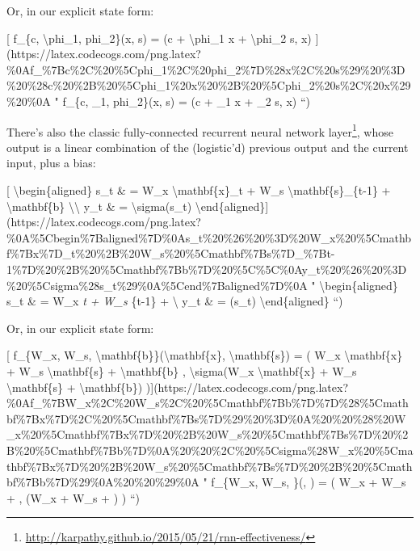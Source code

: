 \documentclass[]{article}
\renewcommand{\href}[2]{#2\footnote{\url{#1}}}
\begin{document}
Or, in our explicit state form:

{[} f\_\{c, \textbackslash{}phi\_1, phi\_2\}(x, s) = (c + \textbackslash{}phi\_1
x + \textbackslash{}phi\_2 s, x)
{]}(https://latex.codecogs.com/png.latex?\%0Af\_\%7Bc\%2C\%20\%5Cphi\_1\%2C\%20phi\_2\%7D\%28x\%2C\%20s\%29\%20\%3D\%20\%28c\%20\%2B\%20\%5Cphi\_1\%20x\%20\%2B\%20\%5Cphi\_2\%20s\%2C\%20x\%29\%20\%0A
" f\_\{c, \phi\_1, phi\_2\}(x, s) = (c + \phi\_1 x + \phi\_2 s, x) ``)

There's also the classic
\href{http://karpathy.github.io/2015/05/21/rnn-effectiveness/}{fully-connected
recurrent neural network layer}, whose output is a linear combination of the
(logistic'd) previous output and the current input, plus a bias:

{[} \textbackslash{}begin\{aligned\} s\_t \& = W\_x
\textbackslash{}mathbf\{x\}\_t + W\_s \textbackslash{}mathbf\{s\}\_\{t-1\} +
\textbackslash{}mathbf\{b\} \textbackslash{}\textbackslash{} y\_t \& =
\textbackslash{}sigma(s\_t)
\textbackslash{}end\{aligned\}{]}(https://latex.codecogs.com/png.latex?\%0A\%5Cbegin\%7Baligned\%7D\%0As\_t\%20\%26\%20\%3D\%20W\_x\%20\%5Cmathbf\%7Bx\%7D\_t\%20\%2B\%20W\_s\%20\%5Cmathbf\%7Bs\%7D\_\%7Bt-1\%7D\%20\%2B\%20\%5Cmathbf\%7Bb\%7D\%20\%5C\%5C\%0Ay\_t\%20\%26\%20\%3D\%20\%5Csigma\%28s\_t\%29\%0A\%5Cend\%7Baligned\%7D\%0A
" \textbackslash{}begin\{aligned\} s\_t \& = W\_x \emph{t + W\_s
}\{t-1\} +  \textbackslash{} y\_t \& = \sigma(s\_t)
\textbackslash{}end\{aligned\} ``)

Or, in our explicit state form:

{[} f\_\{W\_x, W\_s, \textbackslash{}mathbf\{b\}\}(\textbackslash{}mathbf\{x\},
\textbackslash{}mathbf\{s\}) = ( W\_x \textbackslash{}mathbf\{x\} + W\_s
\textbackslash{}mathbf\{s\} + \textbackslash{}mathbf\{b\} ,
\textbackslash{}sigma(W\_x \textbackslash{}mathbf\{x\} + W\_s
\textbackslash{}mathbf\{s\} + \textbackslash{}mathbf\{b\})
){]}(https://latex.codecogs.com/png.latex?\%0Af\_\%7BW\_x\%2C\%20W\_s\%2C\%20\%5Cmathbf\%7Bb\%7D\%7D\%28\%5Cmathbf\%7Bx\%7D\%2C\%20\%5Cmathbf\%7Bs\%7D\%29\%20\%3D\%0A\%20\%20\%28\%20W\_x\%20\%5Cmathbf\%7Bx\%7D\%20\%2B\%20W\_s\%20\%5Cmathbf\%7Bs\%7D\%20\%2B\%20\%5Cmathbf\%7Bb\%7D\%0A\%20\%20\%2C\%20\%5Csigma\%28W\_x\%20\%5Cmathbf\%7Bx\%7D\%20\%2B\%20W\_s\%20\%5Cmathbf\%7Bs\%7D\%20\%2B\%20\%5Cmathbf\%7Bb\%7D\%29\%0A\%20\%20\%29\%0A
" f\_\{W\_x, W\_s, \}(, ) = ( W\_x  +
W\_s  +  , \sigma(W\_x  + W\_s  +
) ) ``)
\end{document}
